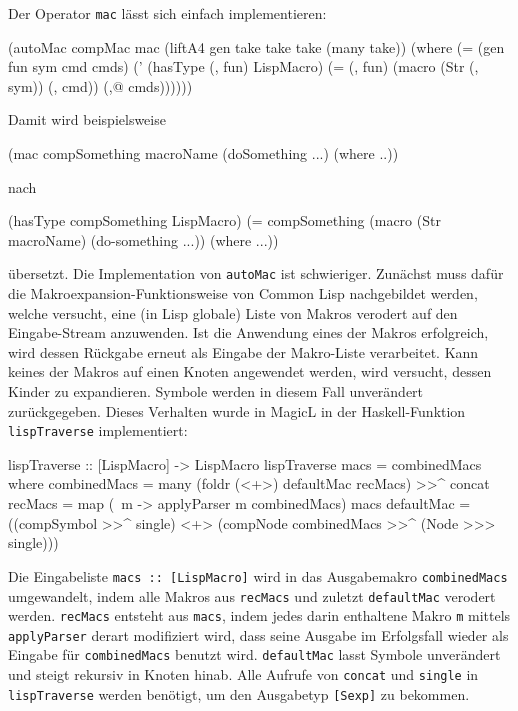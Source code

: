 \documentclass[11pt, a4paper, bibgerm]{scrbook}
\newenvironment{DIFnomarkup}{}{}
\newcommand\icode[1]{\lstinline?#1?}
\begin{document}
Der Operator \icode{mac} lässt sich einfach implementieren:
\begin{DIFnomarkup}\begin{code}
(autoMac compMac mac
  (liftA4 gen take take take (many take))
  (where (= (gen fun sym cmd cmds)
            (' (hasType (, fun) LispMacro)
               (= (, fun) (macro (Str (, sym)) (, cmd)) (,@ cmds))))))  
\end{code}\end{DIFnomarkup}
Damit wird beispielsweise 
\begin{DIFnomarkup}\begin{code}
(mac compSomething macroName 
    (doSomething ...) 
  (where ..))
\end{code}\end{DIFnomarkup}
nach
\begin{DIFnomarkup}\begin{code}
(hasType compSomething LispMacro)
(= compSomething (macro (Str macroName)
                   (do-something ...))
  (where ...))
\end{code}\end{DIFnomarkup}
übersetzt. Die Implementation von \icode{autoMac} ist
schwieriger. Zunächst muss dafür die Makroexpansion-Funktionsweise von
Common Lisp nachgebildet werden, welche versucht, eine (in Lisp
globale) Liste von Makros verodert auf den Eingabe-Stream anzuwenden. Ist
die Anwendung eines der Makros erfolgreich, wird dessen Rückgabe erneut
als Eingabe der Makro-Liste verarbeitet. Kann keines der Makros auf einen
Knoten angewendet werden, wird versucht, dessen Kinder zu
expandieren. Symbole werden in diesem Fall unverändert
zurückgegeben. Dieses Verhalten wurde in MagicL in der Haskell-Funktion
\icode{lispTraverse} implementiert:
\begin{DIFnomarkup}\begin{code}
lispTraverse :: [LispMacro] -> LispMacro
lispTraverse macs = combinedMacs
  where combinedMacs = many (foldr (<+>) defaultMac recMacs) >>^ concat
        recMacs      = map (\ m -> applyParser m combinedMacs) macs
        defaultMac   = ((compSymbol >>^ single) <+> 
                        (compNode combinedMacs >>^ (Node >>> single)))  
\end{code}\end{DIFnomarkup}
Die Eingabeliste \icode{macs :: [LispMacro]} wird in das Ausgabemakro
\icode{combinedMacs} umgewandelt, indem alle Makros aus \icode{recMacs}
und zuletzt \icode{defaultMac} verodert werden. \icode{recMacs} entsteht
aus \icode{macs}, indem jedes darin enthaltene Makro \icode{m} mittels
\icode{applyParser} derart modifiziert wird, dass seine Ausgabe im
Erfolgsfall wieder als Eingabe für \icode{combinedMacs} benutzt
wird. \icode{defaultMac} lasst Symbole unverändert und steigt rekursiv
in Knoten hinab. Alle Aufrufe von \icode{concat} und \icode{single} in
\icode{lispTraverse} werden benötigt, um den Ausgabetyp \icode{[Sexp]}
zu bekommen.
\end{document}
